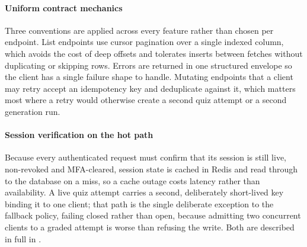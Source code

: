 \paragraph{Uniform contract mechanics}
Three conventions are applied across every feature rather than chosen per endpoint. List endpoints use cursor pagination over a single indexed column, which avoids the cost of deep offsets and tolerates inserts between fetches without duplicating or skipping rows. Errors are returned in one structured envelope so the client has a single failure shape to handle. Mutating endpoints that a client may retry accept an idempotency key and deduplicate against it, which matters most where a retry would otherwise create a second quiz attempt or a second generation run.

\paragraph{Session verification on the hot path}
Because every authenticated request must confirm that its session is still live, non-revoked and MFA-cleared, session state is cached in Redis and read through to the database on a miss, so a cache outage costs latency rather than availability. A live quiz attempt carries a second, deliberately short-lived key binding it to one client; that path is the single deliberate exception to the fallback policy, failing closed rather than open, because admitting two concurrent clients to a graded attempt is worse than refusing the write. Both are described in full in .
